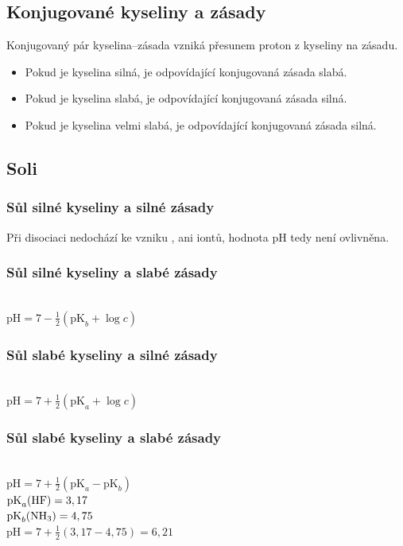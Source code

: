 \subsection{Konjugované kyseliny a zásady}
Konjugovaný pár kyselina--zásada vzniká přesunem proton z kyseliny na zásadu.


\begin{itemize}
	\item Pokud je kyselina silná, je odpovídající konjugovaná zásada slabá.
	\item Pokud je kyselina slabá, je odpovídající konjugovaná zásada silná.
	\item Pokud je kyselina velmi slabá, je odpovídající konjugovaná zásada silná.
\end{itemize}

\subsection{Soli}

\subsubsection{Sůl silné kyseliny a silné zásady}


Při disociaci nedochází ke vzniku , ani  iontů, hodnota pH tedy není ovlivněna.

\subsubsection{Sůl silné kyseliny a slabé zásady}
\\
$\textrm{pH} = 7 - \frac{1}{2}(\textrm{pK}_b + \log c)$ \\

\subsubsection{Sůl slabé kyseliny a silné zásady}
\\
$\textrm{pH} = 7 + \frac{1}{2}(\textrm{pK}_a + \log c)$ \\

\subsubsection{Sůl slabé kyseliny a slabé zásady}
\\
$\textrm{pH} = 7 + \frac{1}{2}(\textrm{pK}_a - \textrm{pK}_b)$\\
$\textrm{pK}_a (\ce{HF}) = 3,17$\\
$\textrm{pK}_b (\ce{NH3}) = 4,75$\\
$\textrm{pH} = 7 + \frac{1}{2}(3,17 - 4,75) = 6,21$\\

